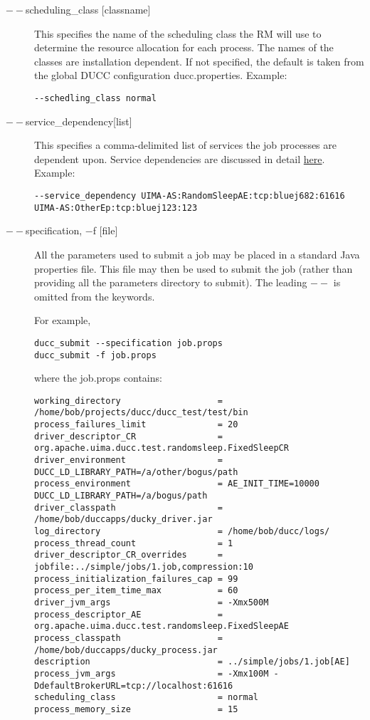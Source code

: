 \begin{description}
           \item[$--$scheduling\_class {[classname]} ] This specifies the name of the scheduling class
             the RM will use to determine the resource allocation for each process. The names of the
             classes are installation dependent. If not specified, the default is taken from the
             global DUCC configuration ducc.properties.  Example:
             \begin{verbatim}
--schedling_class normal 
             \end{verbatim}
          

           \item[$--$service\_dependency{[list]}] This specifies a comma-delimited list of services the job
             processes are dependent upon. Service dependencies are discussed in detail
             \hyperref[sec:service.endpoints]{here}. Example:
\begin{verbatim}
--service_dependency UIMA-AS:RandomSleepAE:tcp:bluej682:61616 UIMA-AS:OtherEp:tcp:bluej123:123 
\end{verbatim}

           \item[$--$specification, $-$f {[file]}  ]

             All the parameters used to submit a job may be placed in a standard Java properties file. 
             This file may then be used to submit the job (rather than providing all the parameters 
             directory to submit). The leading $--$ is omitted from the keywords.

             For example, 
\begin{verbatim}
ducc_submit --specification job.props 
ducc_submit -f job.props 
\end{verbatim}

             where the job.props contains: 
\begin{verbatim}
working_directory                   = /home/bob/projects/ducc/ducc_test/test/bin 
process_failures_limit              = 20 
driver_descriptor_CR                = org.apache.uima.ducc.test.randomsleep.FixedSleepCR 
driver_environment                  = DUCC_LD_LIBRARY_PATH=/a/other/bogus/path 
process_environment                 = AE_INIT_TIME=10000 DUCC_LD_LIBRARY_PATH=/a/bogus/path 
driver_classpath                    = /home/bob/duccapps/ducky_driver.jar 
log_directory                       = /home/bob/ducc/logs/ 
process_thread_count                = 1 
driver_descriptor_CR_overrides      = jobfile:../simple/jobs/1.job,compression:10 
process_initialization_failures_cap = 99 
process_per_item_time_max           = 60 
driver_jvm_args                     = -Xmx500M 
process_descriptor_AE               = org.apache.uima.ducc.test.randomsleep.FixedSleepAE 
process_classpath                   = /home/bob/duccapps/ducky_process.jar 
description                         = ../simple/jobs/1.job[AE] 
process_jvm_args                    = -Xmx100M -DdefaultBrokerURL=tcp://localhost:61616 
scheduling_class                    = normal 
process_memory_size                 = 15 
\end{verbatim}


\end{description}
